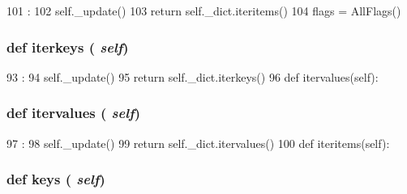 \begin{DoxyCode}
101                        :
102         self._update()
103         return self._dict.iteritems()
104 
flags = AllFlags()
\end{DoxyCode}
\hypertarget{classm5_1_1debug_1_1AllFlags_a44560b0b40dfcd2069b980760783cc7b}{
\subsubsection[{iterkeys}]{\setlength{\rightskip}{0pt plus 5cm}def iterkeys ( {\em self})}}
\label{classm5_1_1debug_1_1AllFlags_a44560b0b40dfcd2069b980760783cc7b}



\begin{DoxyCode}
93                       :
94         self._update()
95         return self._dict.iterkeys()
96 
    def itervalues(self):
\end{DoxyCode}
\hypertarget{classm5_1_1debug_1_1AllFlags_aeb6e8630a10560ad0d4b34377c790f19}{
\subsubsection[{itervalues}]{\setlength{\rightskip}{0pt plus 5cm}def itervalues ( {\em self})}}
\label{classm5_1_1debug_1_1AllFlags_aeb6e8630a10560ad0d4b34377c790f19}



\begin{DoxyCode}
97                         :
98         self._update()
99         return self._dict.itervalues()
100 
    def iteritems(self):
\end{DoxyCode}
\hypertarget{classm5_1_1debug_1_1AllFlags_aeb7ba70a3c91eced4f8d49ac5dc0c398}{
\subsubsection[{keys}]{\setlength{\rightskip}{0pt plus 5cm}def keys ( {\em self})}}
\label{classm5_1_1debug_1_1AllFlags_aeb7ba70a3c91eced4f8d49ac5dc0c398}



